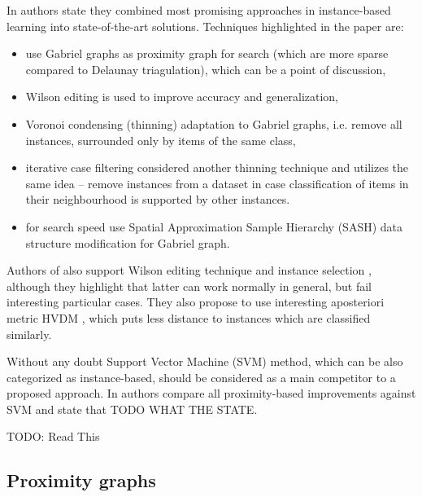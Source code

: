 In \cite{BhattacharyaGeometricDR} authors state they combined most promising approaches in instance-based learning into state-of-the-art solutions. Techniques highlighted in the paper are:
\begin{itemize}
    \item use Gabriel graphs as proximity graph for search (which are more sparse compared to Delaunay triagulation), which can be a point of discussion,
    \item Wilson editing \cite{Wilson} is used to improve accuracy and generalization,
    \item Voronoi condensing (thinning) adaptation to Gabriel graphs, i.e. remove all instances, surrounded only by items of the same class,
    \item iterative case filtering \cite{IterativeCaseFiltering} considered another thinning technique and utilizes the same idea -- remove instances from a dataset in case classification of items in their neighbourhood is supported by other instances.
    \item for search speed use Spatial Approximation Sample Hierarchy (SASH) data structure modification for Gabriel graph.
\end{itemize}

Authors of \cite{ProximityGraphSurvey} also support Wilson editing \cite{Wilson} technique and instance selection \cite{InstanceSelection}, although they highlight that latter can work normally in general, but fail interesting particular cases. They also propose to use interesting aposteriori metric HVDM \cite{HVDM}, which puts less distance to instances which are classified similarly.

Without any doubt Support Vector Machine (SVM) method, which can be also categorized as instance-based, should be considered as a main competitor to a proposed approach. In \cite{ProximityGraphSurvey} authors compare all proximity-based improvements against SVM and state that TODO WHAT THE STATE.

TODO: Read This \cite{BhattacharyaGeometricPaper}

\subsection{Proximity graphs}


